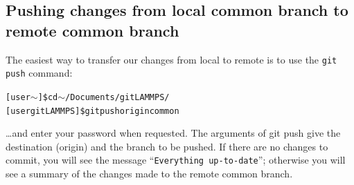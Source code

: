 \documentclass[a4paper,oneside,11pt]{article}
\begin{document}
\subsection{Pushing changes from local common branch to remote common branch}\label{ssec:pclcrc}
The easiest way to transfer our changes from local to remote is to use the \texttt{git push} command:
\begin{alltt}
[user \(\sim\)]\$ cd \(\sim\)/Documents/gitLAMMPS/
[user gitLAMMPS]\$ git push origin common
\end{alltt}
\ldots and enter your password when requested. The arguments of git push give the destination (origin) and the branch to be pushed. If there are no changes to commit, you will see the message ``\texttt{Everything up-to-date}''; otherwise you will see a summary of the changes made to the remote common branch.
\end{document}
